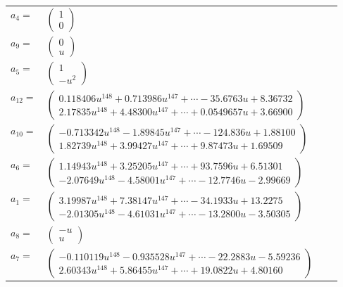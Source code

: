 \documentclass[1p]{elsarticle_modified}
\theoremstyle{definition}
\begin{document}
\begin{tabular}{m{7pt} m{180pt} m{7pt} m{180pt} }
\flushright $a_{4}=$&$\begin{pmatrix}1\\0\end{pmatrix}$ \\
\flushright $a_{9}=$&$\begin{pmatrix}0\\u\end{pmatrix}$ \\
\flushright $a_{5}=$&$\begin{pmatrix}1\\- u^2\end{pmatrix}$ \\
\flushright $a_{12}=$&$\begin{pmatrix}0.118406 u^{148}+0.713986 u^{147}+\cdots-35.6763 u+8.36732\\2.17835 u^{148}+4.48300 u^{147}+\cdots+0.0549657 u+3.66900\end{pmatrix}$ \\
\flushright $a_{10}=$&$\begin{pmatrix}-0.713342 u^{148}-1.89845 u^{147}+\cdots-124.836 u+1.88100\\1.82739 u^{148}+3.99427 u^{147}+\cdots+9.87473 u+1.69509\end{pmatrix}$ \\
\flushright $a_{6}=$&$\begin{pmatrix}1.14943 u^{148}+3.25205 u^{147}+\cdots+93.7596 u+6.51301\\-2.07649 u^{148}-4.58001 u^{147}+\cdots-12.7746 u-2.99669\end{pmatrix}$ \\
\flushright $a_{1}=$&$\begin{pmatrix}3.19987 u^{148}+7.38147 u^{147}+\cdots-34.1933 u+13.2275\\-2.01305 u^{148}-4.61031 u^{147}+\cdots-13.2800 u-3.50305\end{pmatrix}$ \\
\flushright $a_{8}=$&$\begin{pmatrix}- u\\u\end{pmatrix}$ \\
\flushright $a_{7}=$&$\begin{pmatrix}-0.110119 u^{148}-0.935528 u^{147}+\cdots-22.2883 u-5.59236\\2.60343 u^{148}+5.86455 u^{147}+\cdots+19.0822 u+4.80160\end{pmatrix}$ \\

\end{tabular}
\end{document}
